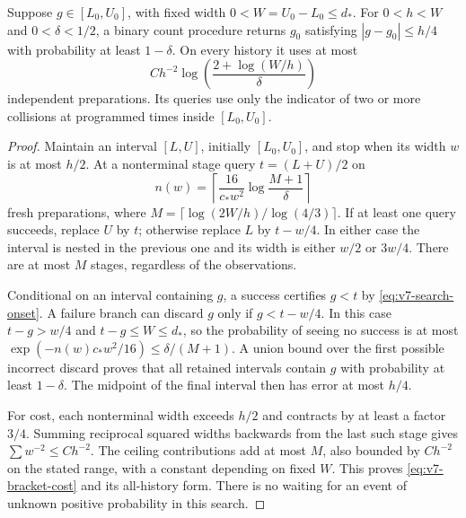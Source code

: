 \begin{lemma}
\label{lem:v7-bracket}
Suppose $g\in[L_0,U_0]$, with fixed width $0<W=U_0-L_0\le d_*$.
For $0<h<W$ and $0<\delta<1/2$, a binary count procedure returns
$g_0$ satisfying $|g-g_0|\le h/4$ with probability at least
$1-\delta$. On every history it uses at most
\begin{equation}\label{eq:v7-bracket-cost}
 C h^{-2}\log\left(\frac{2+\log(W/h)}{\delta}\right)
\end{equation}
independent preparations. Its queries use only the indicator of two
or more collisions at programmed times inside $[L_0,U_0]$.
\end{lemma}
\begin{proof}
Maintain an interval $[L,U]$, initially $[L_0,U_0]$, and stop when
its width $w$ is at most $h/2$. At a nonterminal stage query
$t=(L+U)/2$ on
\[
 n(w)=\left\lceil\frac{16}{c_*w^2}
                  \log\frac{M+1}{\delta}\right\rceil
\]
fresh preparations, where
$M=\lceil\log(2W/h)/\log(4/3)\rceil$.
If at least one query succeeds, replace $U$ by $t$; otherwise replace
$L$ by $t-w/4$. In either case the interval is nested in the previous
one and its width is either $w/2$ or $3w/4$. There are at most $M$
stages, regardless of the observations.

Conditional on an interval containing $g$, a success certifies $g<t$
by \eqref{eq:v7-search-onset}. A failure branch can discard $g$ only
if $g<t-w/4$. In this case $t-g>w/4$ and $t-g\le W\le d_*$, so the
probability of seeing no success is at most
$\exp(-n(w)c_*w^2/16)\le\delta/(M+1)$. A union bound over the first
possible incorrect discard proves that all retained intervals contain
$g$ with probability at least $1-\delta$. The midpoint of the final
interval then has error at most $h/4$.

For cost, each nonterminal width exceeds $h/2$ and contracts by at
least a factor $3/4$. Summing reciprocal squared widths backwards
from the last such stage gives $\sum w^{-2}\le C h^{-2}$.
The ceiling contributions add at most $M$, also bounded by
$C h^{-2}$ on the stated range, with a constant depending on fixed
$W$. This proves \eqref{eq:v7-bracket-cost} and its all-history form.
There is no waiting for an event of unknown positive probability in
this search.
\end{proof}

